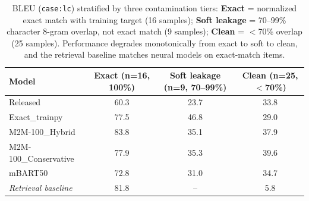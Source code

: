 \begin{table}[t]
\centering
\small
\begin{tabular}{@{}lccc@{}}
\toprule
\textbf{Model} & \textbf{Exact (n=16, 100\%)} & \textbf{Soft leakage (n=9, 70--99\%)} & \textbf{Clean (n=25, $<$70\%)} \\
\midrule
Released         & 60.3 & 23.7 & 33.8 \\
Exact\_trainpy   & 77.5 & 46.8 & 29.0 \\
M2M-100\_Hybrid  & 83.8 & 35.1 & 37.9 \\
M2M-100\_Conservative & 77.9 & 35.3 & 39.6 \\
mBART50          & 72.8 & 31.0 & 34.7 \\
\addlinespace
\textit{Retrieval baseline} & 81.8 & -- & 5.8 \\
\bottomrule
\end{tabular}
\caption{BLEU (\texttt{case:lc}) stratified by three contamination tiers: \textbf{Exact} = normalized exact match with training target (16 samples); \textbf{Soft leakage} = 70--99\% character 8-gram overlap, not exact match (9 samples); \textbf{Clean} = $<$70\% overlap (25 samples). Performance degrades monotonically from exact to soft to clean, and the retrieval baseline matches neural models on exact-match items.}
\label{tab:three-tier}
\end{table}
